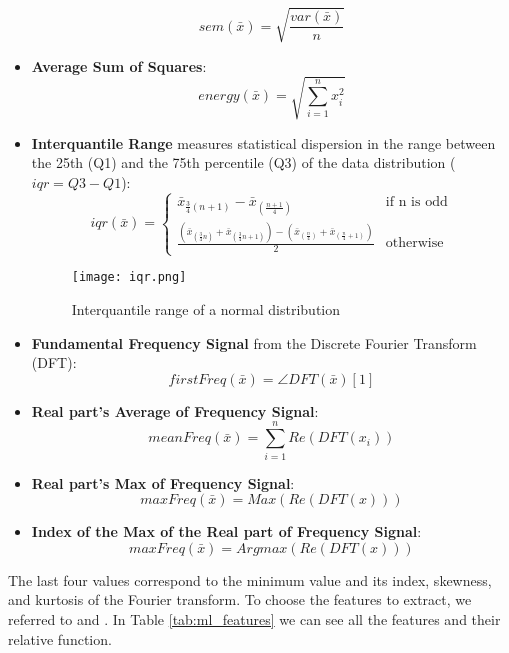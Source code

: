 \begin{itemize}
        \begin{equation}
            sem(\bar{x}) = \sqrt{\frac{var(\bar{x})}{n}}
        \end{equation}
    \item \textbf{Average Sum of Squares}:
        \begin{equation}
            energy(\bar{x}) = \sqrt{\sum_{i=1}^{n} x_i^2}
        \end{equation}
    \item \textbf{Interquantile Range} measures statistical dispersion in the range between the 25th (Q1) and the 75th percentile (Q3) of the data distribution ($ iqr = Q3 - Q1 $):
        \begin{equation}
            iqr(\bar{x}) =  
                \begin{cases} 
                \bar{x}_{\frac{3}{4}(n+1)} - \bar{x}_{(\frac{n+1}{4})} & \text{if n is odd} \\
                \frac{(\bar{x}_{(\frac{3}{4}n)} + \bar{x}_{(\frac{3}{4}n+1)}) - (\bar{x}_{(\frac{n}{4})} + \bar{x}_{(\frac{n}{4}+1)})}{2} & \text{otherwise}
                \end{cases}
        \end{equation}
        \begin{figure}[H]
            \centering
            \texttt{[image: iqr.png]}
            \caption{Interquantile range of a normal distribution}
            \label{fig:iqr}
        \end{figure}
    \item \textbf{Fundamental Frequency Signal} from the Discrete Fourier Transform (DFT):
    \begin{equation}
        firstFreq(\bar{x}) = \angle DFT(\bar{x})[1]
    \end{equation}
    \item \textbf{Real part's Average of Frequency Signal}:
    \begin{equation}
        meanFreq(\bar{x}) = \sum_{i=1}^{n} Re(DFT(x_i))
    \end{equation}
    \item \textbf{Real part's Max of Frequency Signal}:
    \begin{equation}
        maxFreq(\bar{x}) = Max(Re(DFT(x)))
    \end{equation}
    \item \textbf{Index of the Max of the Real part of Frequency Signal}:
    \begin{equation}
        maxFreq(\bar{x}) = Argmax(Re(DFT(x)))
    \end{equation}
\end{itemize}
The last four values correspond to the minimum value and its index, skewness, and kurtosis of the Fourier transform.
To choose the features to extract, we referred to \cite{oneto:2020} and \cite{sama:2010}.
In Table \ref{tab:ml_features} we can see all the features and their relative function.


